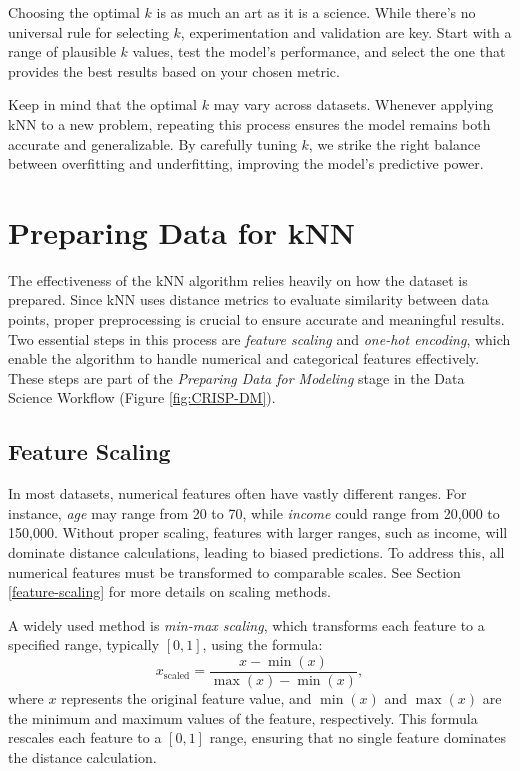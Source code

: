 \documentclass[
]{book}
\theoremstyle{definition}
\theoremstyle{definition}
\theoremstyle{definition}
\theoremstyle{definition}
\theoremstyle{remark}
\begin{document}
Choosing the optimal \(k\) is as much an art as it is a science. While there's no universal rule for selecting \(k\), experimentation and validation are key. Start with a range of plausible \(k\) values, test the model's performance, and select the one that provides the best results based on your chosen metric.

Keep in mind that the optimal \(k\) may vary across datasets. Whenever applying kNN to a new problem, repeating this process ensures the model remains both accurate and generalizable. By carefully tuning \(k\), we strike the right balance between overfitting and underfitting, improving the model's predictive power.

\section{Preparing Data for kNN}\label{preparing-data-for-knn}

The effectiveness of the kNN algorithm relies heavily on how the dataset is prepared. Since kNN uses distance metrics to evaluate similarity between data points, proper preprocessing is crucial to ensure accurate and meaningful results. Two essential steps in this process are \emph{feature scaling} and \emph{one-hot encoding}, which enable the algorithm to handle numerical and categorical features effectively. These steps are part of the \emph{Preparing Data for Modeling} stage in the Data Science Workflow (Figure \ref{fig:CRISP-DM}).

\subsection{Feature Scaling}\label{feature-scaling-1}

In most datasets, numerical features often have vastly different ranges. For instance, \emph{age} may range from 20 to 70, while \emph{income} could range from 20,000 to 150,000. Without proper scaling, features with larger ranges, such as income, will dominate distance calculations, leading to biased predictions. To address this, all numerical features must be transformed to comparable scales. See Section \ref{feature-scaling} for more details on scaling methods.

A widely used method is \emph{min-max scaling}, which transforms each feature to a specified range, typically \([0, 1]\), using the formula:
\[
x_{\text{scaled}} = \frac{x - \min(x)}{\max(x) - \min(x)},
\]
where \(x\) represents the original feature value, and \(\min(x)\) and \(\max(x)\) are the minimum and maximum values of the feature, respectively. This formula rescales each feature to a \([0,1]\) range, ensuring that no single feature dominates the distance calculation.
\end{document}
